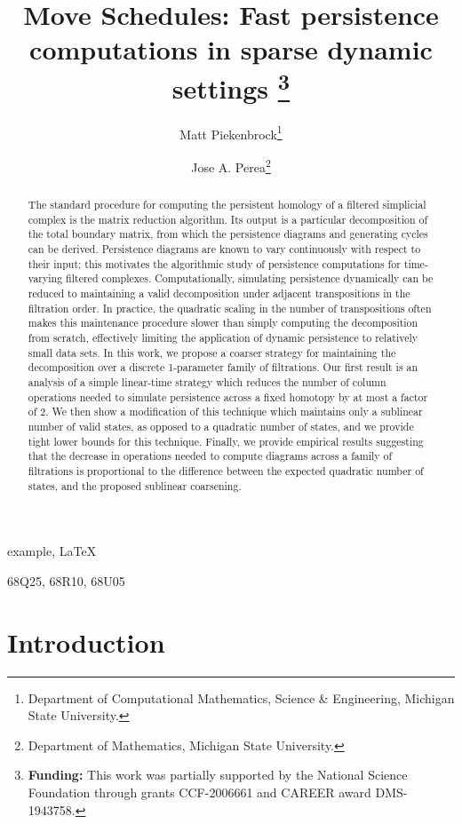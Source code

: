 \documentclass{siamart190516}
\title{Move Schedules: Fast persistence computations in sparse dynamic settings
	\thanks{\textbf{Funding:} This work was partially supported by the National Science Foundation through grants CCF-2006661 and CAREER award DMS-1943758.}
}
\author{
	Matt Piekenbrock\thanks{Department of Computational Mathematics, Science \& Engineering, Michigan State University.}
	\and Jose A. Perea\thanks{Department of Mathematics, Michigan State University.}
}
\begin{document}
 

\maketitle

\begin{abstract}
	The standard procedure for computing the persistent homology of a filtered simplicial complex is the matrix reduction algorithm. Its output is a particular decomposition of the total boundary matrix, from which the persistence diagrams and generating cycles can be derived. 
	Persistence diagrams are known to vary continuously with respect to their input; this motivates the algorithmic study of persistence computations for time-varying filtered complexes. Computationally, simulating persistence dynamically can be reduced to maintaining a valid decomposition under adjacent transpositions in the filtration order. In practice, the quadratic scaling in the number of  transpositions often makes this maintenance procedure slower than simply computing the decomposition from scratch, effectively limiting the application of dynamic persistence to relatively small data sets. In this work, we propose a coarser strategy for maintaining the decomposition over a discrete 1-parameter family of filtrations. Our first result is an analysis of a simple linear-time strategy which reduces the number of column operations needed to simulate persistence across a fixed homotopy by at most a factor of 2. We then show a modification of this technique which maintains only a sublinear number of valid states, as opposed to a quadratic number of states, and we provide tight lower bounds for this technique.
	Finally, we provide empirical results suggesting that the decrease in operations needed to compute diagrams across a family of filtrations is proportional to the difference between the expected quadratic number of states, and the proposed sublinear coarsening.
\end{abstract}


\begin{keywords}
  example, \LaTeX
\end{keywords}

\begin{AMS}
  68Q25, 68R10, 68U05
\end{AMS}

\section{Introduction} 
\end{document}
